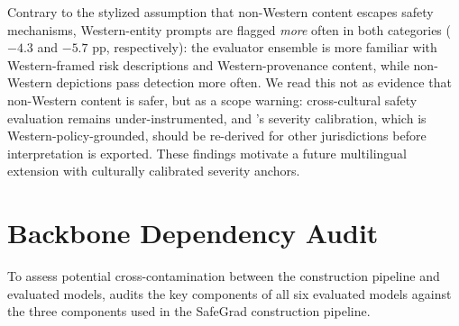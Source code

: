 Contrary to the stylized assumption that non-Western content escapes
safety mechanisms, Western-entity prompts are flagged \emph{more} often
in both categories ($-4.3$ and $-5.7$ pp, respectively): the evaluator
ensemble is more familiar with Western-framed risk descriptions and
Western-provenance content, while non-Western depictions pass detection
more often. We read this not as evidence that non-Western content is
safer, but as a scope warning: cross-cultural safety evaluation remains
under-instrumented, and \dataname's severity calibration, which is
Western-policy-grounded, should be re-derived for other jurisdictions
before interpretation is exported. These findings motivate a future
multilingual extension with culturally calibrated severity anchors.


\section{Backbone Dependency Audit}
\label{app:backbone}

To assess potential cross-contamination between the construction
pipeline and evaluated models, \Tab{\ref{app:tab:backbone}} audits
the key components of all six evaluated models against the three
components used in the SafeGrad construction pipeline.

\begin{table}[tb]
\centering
\caption{Backbone dependency audit. \cmark\ = shared component;
\xmark\ = no shared component. No evaluated model shares an image
encoder or diffusion backbone with any construction pipeline component.}
\label{app:tab:backbone}
\end{table}

